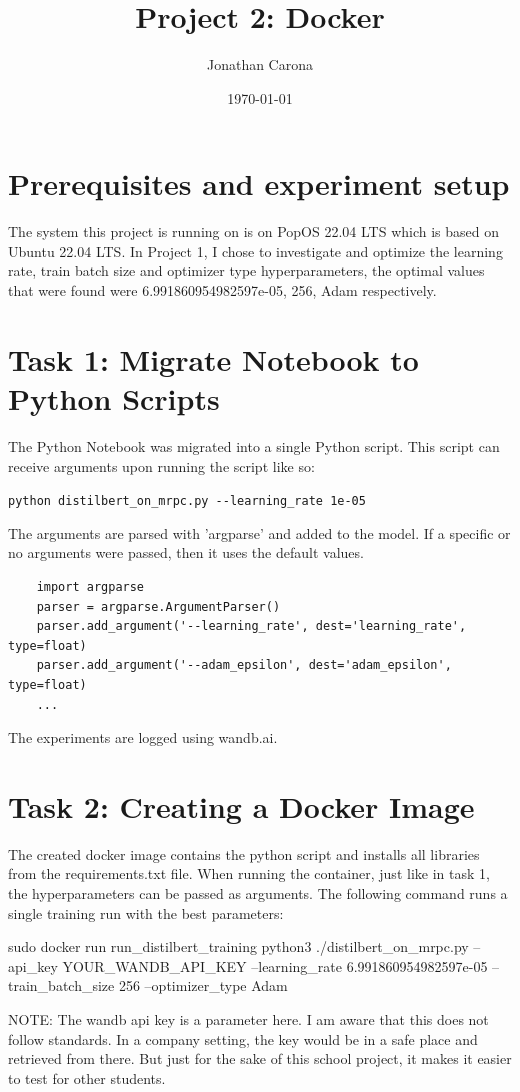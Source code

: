 \documentclass{article}
\title{Project 2: Docker}
\author{Jonathan Carona}
\date{\today}
\begin{document}
\section{Prerequisites and experiment setup}
The system this project is running on is on PopOS 22.04 LTS which is
based on Ubuntu 22.04 LTS. In Project 1, I chose to investigate and optimize the learning rate,
train batch size and optimizer type hyperparameters, the optimal values that were found were
6.991860954982597e-05, 256, Adam respectively.

\section{Task 1: Migrate Notebook to Python Scripts}
The Python Notebook was migrated into a single Python script. This script can receive arguments upon running the script like so:

\verb!python distilbert_on_mrpc.py --learning_rate 1e-05!

The arguments are parsed with 'argparse' and added to the model. If a specific or no arguments were passed, then it uses the default values.
\begin{lstlisting}
    import argparse
    parser = argparse.ArgumentParser()
    parser.add_argument('--learning_rate', dest='learning_rate', type=float)
    parser.add_argument('--adam_epsilon', dest='adam_epsilon', type=float)
    ...
    \end{lstlisting}

The experiments are logged using wandb.ai.

\section{Task 2: Creating a Docker Image}
The created docker image contains the python script and installs all libraries from the requirements.txt file.
When running the container, just like in task 1, the hyperparameters can be passed as arguments. 
The following command runs a single training run with the best parameters:

\begin{spverbatim}
    sudo docker run run_distilbert_training python3 ./distilbert_on_mrpc.py --api_key YOUR_WANDB_API_KEY --learning_rate 6.991860954982597e-05 --train_batch_size 256 --optimizer_type Adam    
    \end{spverbatim}

NOTE: The wandb api key is a parameter here. I am aware that this does not follow standards. In a company setting, the key would be in a safe place and retrieved from there. But just for the sake of this school project, it makes it easier to test for other students.
\end{document}
